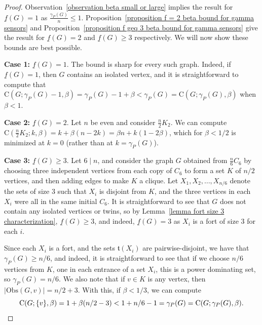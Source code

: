 \documentclass{article}
\begin{document}
        \begin{proof}
            Observation~\ref{observation beta small or large} implies the result for $\underline{f}(G) = 1$ as $\frac{\gamma_P(G)}{n} \leq 1$.                      
            Proposition~\ref{proposition f = 2 beta bound for gamma sensors} and Proposition~\ref{proposition f geq 3 beta bound for gamma sensors} give the result for $\underline{f}(G)=2$ and $\underline{f}(G)\geq 3$ respectively.
            We will now show these bounds are best possible. 
            
            \textbf{Case 1:} $\underline{f}(G)=1$.
            The bound is sharp for every such graph.
            Indeed, if $\underline{f}(G)=1$, then $G$ contains an isolated vertex, and it is straightforward to compute that $\mathrm{C}(G;\gamma_P(G)-1,\beta)=\gamma_P(G)-1+\beta<\gamma_P(G)=\mathrm{C}(G;\gamma_P(G),\beta)$ when $\beta<1$.
            
            \textbf{Case 2:} $\underline{f}(G)=2$.
            Let $n$ be even and consider $\frac{n}{2}K_2$.
            We can compute $\mathrm{C}(\frac{n}{2}K_2;k,\beta)=k+\beta(n-2k)=\beta n+k(1-2\beta)$, which for $\beta<1/2$ is minimized at $k=0$ (rather than at $k=\gamma_P(G)$).
            
            \textbf{Case 3:} $\underline{f}(G)\geq 3$.
            Let $6\mid n$, and consider the graph $G$ obtained from $\frac{n}{6}C_6$ by choosing three independent vertices from each copy of $C_6$ to form a set $K$ of $n/2$ vertices, and then adding edges to make $K$ a clique.
            Let $X_1,X_2,\dots,X_{n/6}$ denote the sets of size $3$ such that $X_i$ is disjoint from $K$, and the three vertices in each $X_i$ were all in the same initial $C_6$.
            It is straightforward to see that $G$ does not contain any isolated vertices or twins, so by Lemma~\ref{lemma fort size 3 characterization}, $\underline{f}(G)\geq 3$, and indeed, $\underline{f}(G)=3$ as $X_i$ is a fort of size $3$ for each $i$.
            
            Since each $X_i$ is a fort, and the sets $\mathfrak{t}(X_i)$ are pairwise-disjoint, we have that $\gamma_P(G)\geq n/6$, and indeed, it is straightforward to see that if we choose $n/6$ vertices from $K$, one in each entrance of a set $X_i$, this is a power dominating set, so $\gamma_P(G)=n/6$.
            We also note that if $v\in K$ is any vertex, then $|\mathrm{Obs}(G,v)|=n/2+3$. With this, if $\beta<1/3$, we can compute
                \[ \mathrm{C}(G;\{v\},\beta)=1+\beta(n/2-3)<1+n/6-1=\gamma_P(G)=\mathrm{C}(G;\gamma_P(G),\beta). \qedhere \]
        \end{proof}
\end{document}
